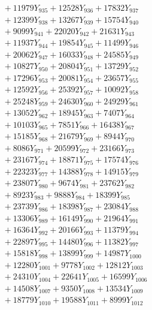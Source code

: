 \documentclass[a4paper,10pt]{article}
\begin{document}
{\begin{align}
&\;  + 11979 Y_{935} + 12528 Y_{936} + 17832 Y_{937} \\[0.3ex]
&\;  + 12399 Y_{938} + 13267 Y_{939} + 15754 Y_{940} \\[0.3ex]
&\;  + 9099 Y_{941} + 22020 Y_{942} + 21631 Y_{943} \\[0.3ex]
&\;  + 11937 Y_{944} + 19854 Y_{945} + 11499 Y_{946} \\[0.3ex]
&\;  + 20062 Y_{947} + 16033 Y_{948} + 24585 Y_{949} \\[0.3ex]
&\;  + 10827 Y_{950} + 20804 Y_{951} + 13729 Y_{952} \\[0.3ex]
&\;  + 17296 Y_{953} + 20081 Y_{954} + 23657 Y_{955} \\[0.3ex]
&\;  + 12592 Y_{956} + 25392 Y_{957} + 10092 Y_{958} \\[0.5ex]\allowbreak
&\;  + 25248 Y_{959} + 24630 Y_{960} + 24929 Y_{961} \\[0.3ex]
&\;  + 13052 Y_{962} + 18945 Y_{963} + 7407 Y_{964} \\[0.3ex]
&\;  + 10103 Y_{965} + 7851 Y_{966} + 16438 Y_{967} \\[0.3ex]
&\;  + 15185 Y_{968} + 21679 Y_{969} + 8944 Y_{970} \\[0.3ex]
&\;  + 8086 Y_{971} + 20599 Y_{972} + 23166 Y_{973} \\[0.3ex]
&\;  + 23167 Y_{974} + 18871 Y_{975} + 17574 Y_{976} \\[0.3ex]
&\;  + 22323 Y_{977} + 14388 Y_{978} + 14915 Y_{979} \\[0.3ex]
&\;  + 23807 Y_{980} + 9674 Y_{981} + 23762 Y_{982} \\[0.3ex]
&\;  + 8923 Y_{983} + 9888 Y_{984} + 18399 Y_{985} \\[0.3ex]
&\;  + 23739 Y_{986} + 18398 Y_{987} + 23084 Y_{988} \\[0.5ex]\allowbreak
&\;  + 13306 Y_{989} + 16149 Y_{990} + 21964 Y_{991} \\[0.3ex]
&\;  + 16364 Y_{992} + 20166 Y_{993} + 11379 Y_{994} \\[0.3ex]
&\;  + 22897 Y_{995} + 14480 Y_{996} + 11382 Y_{997} \\[0.3ex]
&\;  + 15818 Y_{998} + 13899 Y_{999} + 14987 Y_{1000} \\[0.3ex]
&\;  + 12280 Y_{1001} + 9778 Y_{1002} + 12812 Y_{1003} \\[0.3ex]
&\;  + 24310 Y_{1004} + 22641 Y_{1005} + 16599 Y_{1006} \\[0.3ex]
&\;  + 14508 Y_{1007} + 9350 Y_{1008} + 13534 Y_{1009} \\[0.3ex]
&\;  + 18779 Y_{1010} + 19588 Y_{1011} + 8999 Y_{1012} \\[0.3ex]

\end{align}}
\end{document}

